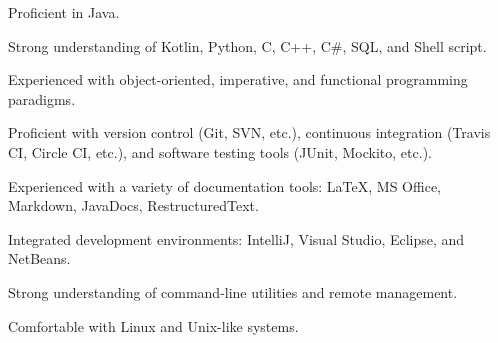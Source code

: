 
\begin{cvskills}
    {
      \begin{cvitems}
        \item {Proficient in Java.}
        \item {Strong understanding of Kotlin, Python, C, C++, C\#, SQL, and Shell script.}
        \item {Experienced with object-oriented, imperative, and functional programming paradigms.}
      \end{cvitems}
    }

  {
    \begin{cvitems}
      \item {Proficient with version control (Git, SVN, etc.), continuous integration (Travis CI, Circle CI, etc.), and software testing tools (JUnit, Mockito, etc.).}
      \item {Experienced with a variety of documentation tools: LaTeX, MS Office, Markdown, JavaDocs, RestructuredText.}
    \end{cvitems}
  }

    {
      \begin{cvitems}
        \item {Integrated development environments: IntelliJ, Visual Studio, Eclipse, and NetBeans.}
        \item {Strong understanding of command-line utilities and remote management.}
        \item {Comfortable with Linux and Unix-like systems.}
      \end{cvitems}
    }

\end{cvskills}
